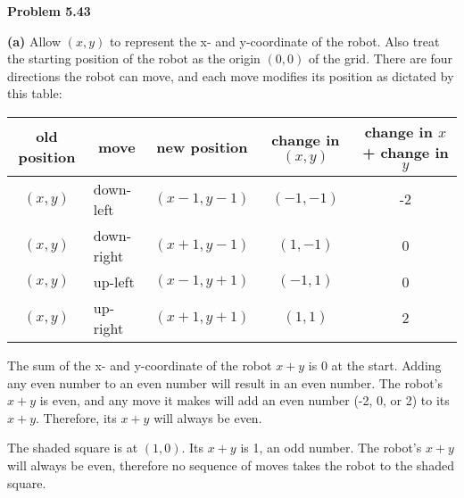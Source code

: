\documentclass[fleqn]{article}
\begin{document}
\newpage
{\noindent\Large\bf Problem 5.43}\vspace{1em}\par
\textbf{(a)} Allow $(x,y)$ to represent the x- and y-coordinate of the robot. Also treat the starting position of the robot as the origin $(0,0)$ of the grid. There are four directions the robot can move, and each move modifies its position as dictated by this table:\vspace{0.35cm}\par
\begin{tabular}{c|l|c|c|c}
	old position & \multicolumn{1}{c|}{move} & new position & change in $(x,y)$ & change in $x$ + change in $y$
	\tabularnewline\hline
	$(x,y)$ & down-left & $(x-1,y-1)$ & $(-1,-1)$ & -2\\
	$(x,y)$ & down-right & $(x+1,y-1)$ & $(1,-1)$ & 0\\
	$(x,y)$ & up-left & $(x-1,y+1)$ & $(-1,1)$ & 0\\
	$(x,y)$ & up-right & $(x+1,y+1)$ & $(1,1)$ & 2
\end{tabular}
\vspace{0.35cm}\par
The sum of the x- and y-coordinate of the robot $x+y$ is 0 at the start. Adding any even number to an even number will result in an even number. The robot's $x+y$ is even, and any move it makes will add an even number (-2, 0, or 2) to its $x+y$. Therefore, its $x+y$ will always be even.\par
The shaded square is at $(1,0)$. Its $x+y$ is 1, an odd number. The robot's $x+y$ will always be even, therefore no sequence of moves takes the robot to the shaded square.\vspace{1em}\par
\end{document}
